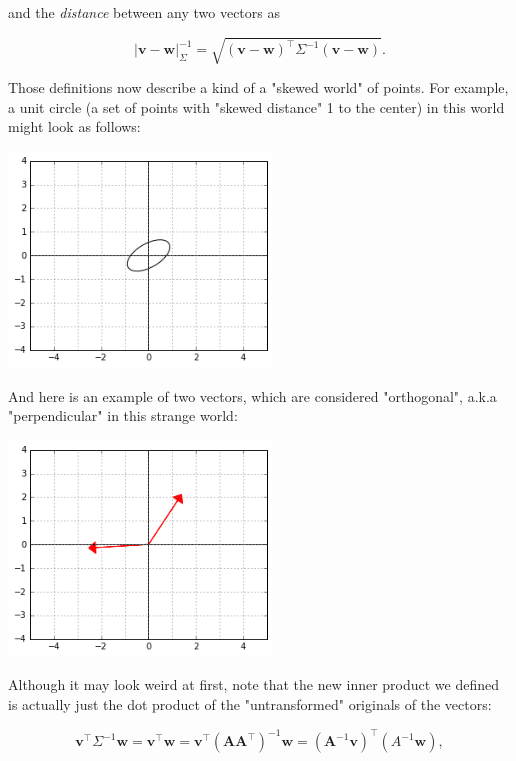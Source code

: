 \documentclass{article}
\begin{document}
and the \textit{distance} between any two vectors as

\begin{equation}
  |\bm{v}-\bm{w}|_{\Sigma}^{-1} = \sqrt{(\bm{v}-\bm{w})^{\intercal}\Sigma^{-1}(\bm{v}-\bm{w})}.
\end{equation}

Those definitions now describe a kind of a "skewed world" of points. For example, a unit circle (a set of points with "skewed distance" 1 to the center) in this world might look as follows:

\begin{center}
  \includegraphics[width=7cm]{figs_hints_3.png}
\end{center}

And here is an example of two vectors, which are considered "orthogonal", a.k.a "perpendicular" in this strange world:

\begin{center}
  \includegraphics[width=7cm]{figs_hints_4.png}
\end{center}

Although it may look weird at first, note that the new inner product we defined is actually just the dot product of the "untransformed" originals of the vectors:

\begin{equation}
  \bm{v}^{\intercal}\Sigma^{-1}\bm{w} = \bm{v}^{\intercal}\bm{w} = 
  \bm{v}^{\intercal}\left(\bm{A}\bm{A}^{\intercal}\right)^{-1}\bm{w} =
  \left(\bm{A}^{-1}\bm{v}\right)^{\intercal}\left(A^{-1}\bm{w}\right),
\end{equation}
\end{document}
